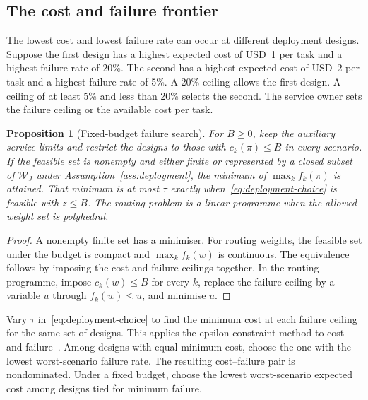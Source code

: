 \documentclass[11pt,reqno]{amsart}
\newtheorem{proposition}[theorem]{Proposition}
\theoremstyle{definition}
\theoremstyle{remark}
\begin{document}
\subsection{The cost and failure frontier}

The lowest cost and lowest failure rate can occur at different deployment designs. Suppose the first design has a highest expected cost of USD~1 per task and a highest failure rate of 20\%. The second has a highest expected cost of USD~2 per task and a highest failure rate of 5\%. A 20\% ceiling allows the first design. A ceiling of at least 5\% and less than 20\% selects the second. The service owner sets the failure ceiling or the available cost per task.

\begin{proposition}[Fixed-budget failure search]\label{prop:budget}
For \(B\ge0\), keep the auxiliary service limits and restrict the designs to those with \(c_k(\pi)\le B\) in every scenario. If the feasible set is nonempty and either finite or represented by a closed subset of \(\mathcal W_J\) under Assumption~\ref{ass:deployment}, the minimum of \(\max_k f_k(\pi)\) is attained. That minimum is at most \(\tau\) exactly when~\eqref{eq:deployment-choice} is feasible with \(z\le B\). The routing problem is a linear programme when the allowed weight set is polyhedral.
\end{proposition}
\begin{proof}
A nonempty finite set has a minimiser. For routing weights, the feasible set under the budget is compact and \(\max_k f_k(w)\) is continuous. The equivalence follows by imposing the cost and failure ceilings together. In the routing programme, impose \(c_k(w)\le B\) for every \(k\), replace the failure ceiling by a variable \(u\) through \(f_k(w)\le u\), and minimise \(u\).
\end{proof}

Vary \(\tau\) in~\eqref{eq:deployment-choice} to find the minimum cost at each failure ceiling for the same set of designs. This applies the epsilon-constraint method to cost and failure~\cite{mavrotas2009}. Among designs with equal minimum cost, choose the one with the lowest worst-scenario failure rate. The resulting cost--failure pair is nondominated. Under a fixed budget, choose the lowest worst-scenario expected cost among designs tied for minimum failure.
\end{document}
